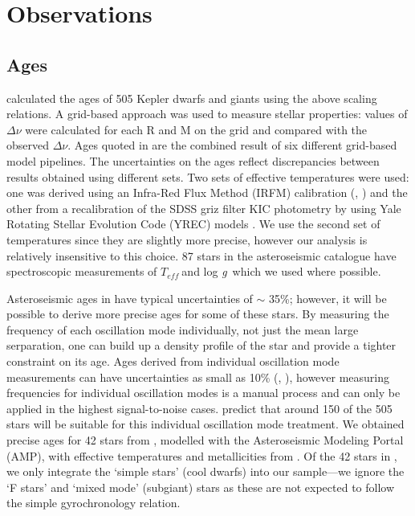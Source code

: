 \documentclass[10pt,preprint]{aastex}
\newcommand{\logg}{log \emph{g}~}
\newcommand{\teff}{$T_{eff}~$}
\begin{document}
\section{Observations}
\label{sec:data}

\subsection{Ages}
\label{sec:ages}

\citet{Chaplin2013} calculated the ages of 505 Kepler dwarfs and giants using the above scaling relations.
A grid-based approach was used to measure stellar properties: values of $\Delta\nu$ were calculated for each R and M on the grid and compared with the observed $\Delta\nu$.
Ages quoted in \citet{Chaplin2013} are the combined result of six different grid-based model pipelines.
The uncertainties on the ages reflect discrepancies between results obtained using different sets.
Two sets of effective temperatures were used: one was derived using an Infra-Red Flux Method (IRFM) calibration (\citealt{Casagrande2010}, \citealt{SilvaAguirre2012}) and the other from a recalibration of the SDSS griz filter KIC photometry by \citet{Pinsonneault2012} using Yale Rotating Stellar Evolution Code (YREC) models \citep{Demarque2004}.
We use the second set of temperatures since they are slightly more precise, however our analysis is relatively insensitive to this choice.
87 stars in the asteroseismic catalogue have spectroscopic measurements of \teff and \logg which we used where possible.

Asteroseismic ages in \citet{Chaplin2013} have typical uncertainties of $\sim$ 35\%; however, it will be possible to derive more precise ages for some of these stars.
By measuring the frequency of each oscillation mode individually, not just the mean large serparation, one can build up a density profile of the star and provide a tighter constraint on its age.
Ages derived from individual oscillation mode measurements can have uncertainties as small as 10\% (\citet{Brown1994}, \citet{SilvaAguirre2013}), however measuring frequencies for individual oscillation modes is a manual process and can only be applied in the highest signal-to-noise cases.
\citet{Chaplin2013} predict that around 150 of the 505 stars will be suitable for this individual oscillation mode treatment.
We obtained precise ages for 42 stars from \citet{Metcalfe2014}, modelled with the Asteroseismic Modeling Portal (AMP), with effective temperatures and metallicities from \citet{Bruntt2012}.
Of the 42 stars in \citet{Metcalfe2014}, we only integrate the `simple stars' (cool dwarfs) into our sample---we ignore the `F stars' and `mixed mode' (subgiant) stars as these are not expected to follow the simple gyrochronology relation.
\end{document}
